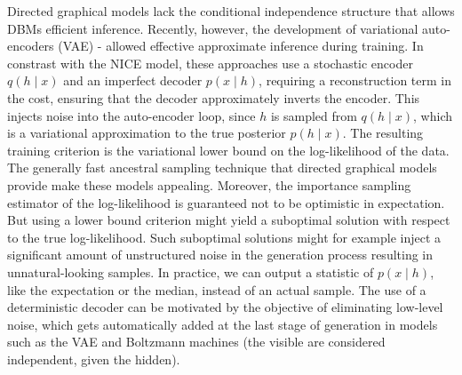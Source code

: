 \documentclass{article}
\begin{document}
Directed graphical models lack the conditional independence structure
that allows DBMs efficient inference.
Recently, however, the development of variational auto-encoders (VAE) 
\citep{Kingma+Welling-ICLR2014,
Rezende-et-al-arxiv2014,Mnih+Gregor-ICML2014,Gregor-et-al-ICML2014} - allowed
effective approximate inference during training.
In constrast with the NICE model, these approaches use
a stochastic encoder $q(h \mid x)$ and an imperfect decoder $p(x \mid h)$,
requiring a reconstruction
term in the cost, ensuring that
the decoder approximately inverts the encoder.
This injects noise into the auto-encoder loop, since $h$ is sampled from $q(h \mid x)$,
which is a variational approximation to the true posterior $p(h \mid x)$.
The resulting training criterion is the variational lower bound on the log-likelihood of the data.
The generally fast ancestral sampling technique that directed graphical models provide make these models appealing. 
Moreover, the importance sampling estimator of the log-likelihood is guaranteed not to be optimistic in expectation. 
But using a lower bound criterion might yield a suboptimal solution with respect to the true log-likelihood.
Such suboptimal solutions might for example inject a significant amount of unstructured noise in the generation
process resulting in unnatural-looking samples.
In practice, we can output a statistic of $p(x \mid h)$, like the expectation
or the median, instead of an actual sample. 
The use of a deterministic decoder can be motivated by the objective of eliminating low-level noise,
which gets automatically added at the last stage of generation in models 
such as the VAE and Boltzmann machines (the visible are considered independent, given the hidden).
\end{document}

